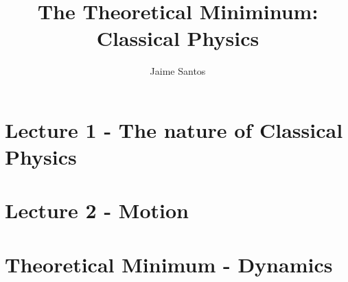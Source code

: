 \documentclass{book}
\title{The Theoretical Miniminum: Classical Physics}
\author{Jaime Santos}
\begin{document}
\maketitle
\tableofcontents

\chapter{Lecture 1 - The nature of Classical Physics}
    

\chapter{Lecture 2 - Motion}
    

\chapter{Theoretical Minimum - Dynamics}
    





\end{document}
